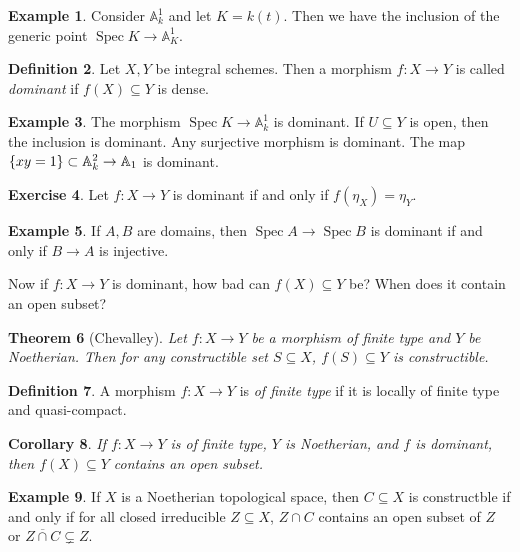 \documentclass[leqno, openany]{memoir}
\newtheorem{thm}{Theorem}[section]
\newtheorem{cor}[thm]{Corollary}
\theoremstyle{definition}
\newtheorem{defn}[thm]{Definition}
\newtheorem{exm}[thm]{Example}
\newtheorem{exer}[thm]{Exercise}
\theoremstyle{remark}
\theoremstyle{plain}
\theoremstyle{definition}
\theoremstyle{remark}
\newcommand{\A}{\mathbb{A}}
\newcommand{\ol}[1]{\overline{#1}}
\DeclareMathOperator{\Spec}{Spec}
\begin{document}
\begin{exm}
    Consider $\A^1_k$ and let $K = k(t)$. Then we have the inclusion of the generic point $\Spec K \to \A^1_K$.
\end{exm}

\begin{defn}
    Let $X,Y$ be integral schemes. Then a morphism $f \colon X \to Y$ is called \textit{dominant} if $f(X) \subseteq Y$ is dense.
\end{defn}

\begin{exm}
    The morphism $\Spec K \to \A^1_k$ is dominant. If $U \subseteq Y$ is open, then the inclusion is dominant. Any surjective morphism is dominant. The map $\qty{xy = 1} \subset \A^2_k \to \A_1$ is dominant.
\end{exm}

\begin{exer}
    Let $f \colon X \to Y$ is dominant if and only if $f(\eta_X) = \eta_Y$.
\end{exer}

\begin{exm}
    If $A, B$ are domains, then $\Spec A \to \Spec B$ is dominant if and only if $B \to A$ is injective.
\end{exm}

Now if $f \colon X \to Y$ is dominant, how bad can $f(X) \subseteq Y$ be? When does it contain an open subset?

\begin{thm}[Chevalley]
    Let $f \colon X \to Y$ be a morphism of finite type and $Y$ be Noetherian. Then for any constructible set $S \subseteq X$, $f(S) \subseteq Y$ is constructible.
\end{thm}

\begin{defn}
    A morphism $f \colon X \to Y$ is \textit{of finite type} if it is locally of finite type and quasi-compact.
\end{defn}

\begin{cor}
    If $f \colon X \to Y$ is of finite type, $Y$ is Noetherian, and $f$ is dominant, then $f(X) \subseteq Y$ contains an open subset.
\end{cor}

\begin{exm}
    If $X$ is a Noetherian topological space, then $C \subseteq X$ is constructble if and only if for all closed irreducible $Z \subseteq X$, $Z \cap C$ contains an open subset of $Z$ or $\ol{Z \cap C} \subsetneq Z$. 
\end{exm}
\end{document}
